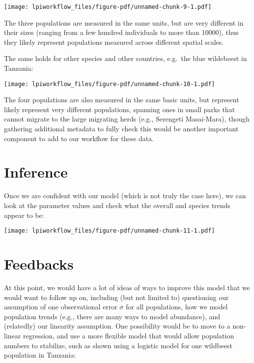 \documentclass[
  letterpaper,
  DIV=11,
  numbers=noendperiod]{scrartcl}
\begin{document}
\texttt{[image: lpiworkflow\_files/figure-pdf/unnamed-chunk-9-1.pdf]}

The three populations are measured in the same units, but are very
different in their sizes (ranging from a few hundred individuals to more
than 10000), thus they likely represent populations measured across
different spatial scales.

The same holds for other species and other countries, e.g.~the blue
wildebeest in Tanzania:

\texttt{[image: lpiworkflow\_files/figure-pdf/unnamed-chunk-10-1.pdf]}

The four populations are also measured in the same basic units, but
represent likely represent very different populations, spanning ones in
small parks that cannot migrate to the large migrating herds (e.g.,
Serengeti Masai-Mara), though gathering additional metadata to fully
check this would be another important component to add to our workflow
for these data.

\section{Inference}\label{inference}

Once we are confident with our model (which is not truly the case here),
we can look at the parameter values and check what the overall and
species trends appear to be:

\texttt{[image: lpiworkflow\_files/figure-pdf/unnamed-chunk-11-1.pdf]}

\section{Feedbacks}\label{feedbacks}

At this point, we would have a lot of ideas of ways to improve this
model that we would want to follow up on, including (but not limited to)
questioning our assumption of one observational error \(\sigma\) for all
populations, how we model population trends (e.g., there are many ways
to model abundance), and (relatedly) our linearity assumption. One
possibility would be to move to a non-linear regression, and use a more
flexible model that would allow population numbers to stabilize, such as
shown using a logistic model for one wildbeest population in Tanzania:
\end{document}
